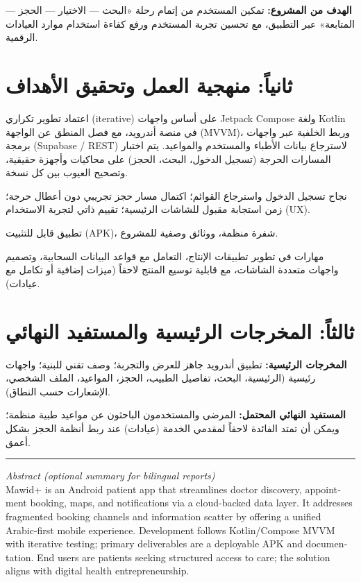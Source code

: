 \documentclass[12pt,a4paper]{article}
\newcommand{\en}[1]{\foreignlanguage{english}{#1}}
\begin{document}
\textbf{الهدف من المشروع:} تمكين المستخدم من إتمام رحلة «البحث — الاختيار — الحجز — المتابعة» عبر التطبيق، مع تحسين تجربة المستخدم ورفع كفاءة استخدام موارد العيادات الرقمية.

\section*{ثانياً: منهجية العمل وتحقيق الأهداف}

\begin{description}[style=nextline,leftmargin=0cm]
\item[منهجية العمل:]
اعتماد تطوير تكراري (\en{iterative}) على أساس واجهات \en{Jetpack Compose} ولغة \en{Kotlin} في منصة أندرويد، مع فصل المنطق عن الواجهة (\en{MVVM})، وربط الخلفية عبر واجهات برمجة (\en{Supabase / REST}) لاسترجاع بيانات الأطباء والمستخدم والمواعيد. يتم اختبار المسارات الحرجة (تسجيل الدخول، البحث، الحجز) على محاكيات وأجهزة حقيقية، وتصحيح العيوب بين كل نسخة.

\item[مؤشرات تحقق الأهداف:]
نجاح تسجيل الدخول واسترجاع القوائم؛ اكتمال مسار حجز تجريبي دون أعطال حرجة؛ زمن استجابة مقبول للشاشات الرئيسية؛ تقييم ذاتي لتجربة الاستخدام (\en{UX}).

\item[المخرجات:]
تطبيق قابل للتثبيت (\en{APK})، شفرة منظمة، ووثائق وصفية للمشروع.

\item[العوائد:]
مهارات في تطوير تطبيقات الإنتاج، التعامل مع قواعد البيانات السحابية، وتصميم واجهات متعددة الشاشات، مع قابلية توسيع المنتج لاحقاً (ميزات إضافية أو تكامل مع عيادات).
\end{description}

\section*{ثالثاً: المخرجات الرئيسية والمستفيد النهائي}

\textbf{المخرجات الرئيسية:} تطبيق أندرويد جاهز للعرض والتجربة؛ وصف تقني للبنية؛ واجهات رئيسية (الرئيسية، البحث، تفاصيل الطبيب، الحجز، المواعيد، الملف الشخصي، الإشعارات حسب النطاق).

\textbf{المستفيد النهائي المحتمل:} المرضى والمستخدمون الباحثون عن مواعيد طبية منظمة؛ ويمكن أن تمتد الفائدة لاحقاً لمقدمي الخدمة (عيادات) عند ربط أنظمة الحجز بشكل أعمق.

\vspace{2em}
\noindent\rule{\textwidth}{0.4pt}

\begin{english}
\begin{center}
\small
\textit{Abstract (optional summary for bilingual reports)}\\
Mawid+ is an Android patient app that streamlines doctor discovery, appointment booking, maps, and notifications via a cloud-backed data layer. It addresses fragmented booking channels and information scatter by offering a unified Arabic-first mobile experience. Development follows Kotlin/Compose MVVM with iterative testing; primary deliverables are a deployable APK and documentation. End users are patients seeking structured access to care; the solution aligns with digital health entrepreneurship.
\end{center}
\end{english}
\end{document}
